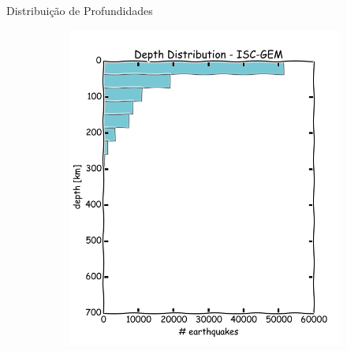 \documentclass[ucs,8pt]{beamer}
\begin{document}
\begin{frame}{Distribuição de Profundidades}
\begin{figure}[H]
	\centering
	\begin{subfigure}[t]{0.45\textwidth}
		  	\centering
			\includegraphics[width=1.00\textwidth]{dep_sa_hist}
			\label{fig:sa_dep_hist}
	\end{subfigure}%
	\quad %
	\begin{subfigure}[t]{0.4\textwidth}
		  	\centering

\end{subfigure}
\end{figure}
\end{frame}
\end{document}
